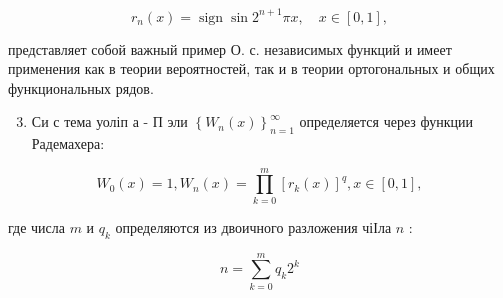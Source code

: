 \documentclass[10pt]{article}
\begin{document}
\[

r_{n}(x)=\operatorname{sign} \sin 2^{n+1} \pi x, \quad x \in[0,1],

\]



представляет собой важный пример О. с. независимых функций и имеет применения как в теории вероятностей, так и в теории ортогональных и общих функциональных рядов.



\begin{enumerate}

  \setcounter{enumi}{2}

  \item Си с тема уоліп а - П эли $\left\{W_{n}(x)\right\}_{n=1}^{\infty}$ определяется через функции Радемахера:

\end{enumerate}



\[

W_{0}(x)=1, W_{n}(x)=\prod_{k=0}^{m}\left[r_{k}(x)\right]^{q}, x \in[0,1],

\]



где числа $m$ и $q_{k}$ определяются из двоичного разложения чіІла $n$ :



\[

n=\sum_{k=0}^{m} q_{k} 2^{k}

\]
\end{document}
